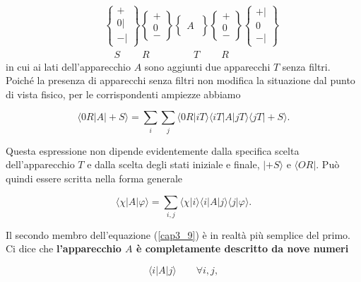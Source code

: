 \documentclass[a4paper,12pt,oneside]{book}
\begin{document}
\begin{eqnarray}
& &\begin{Bmatrix}
 + \\ 0 | \\ - |  
\end{Bmatrix}
\begin{Bmatrix}
  + \\ 0  \\ -   
\end{Bmatrix}
\begin{Bmatrix}
\quad \\  A  \\ \quad 
\end{Bmatrix}
\begin{Bmatrix}
  + \\ 0  \\ -   
\end{Bmatrix}
\begin{Bmatrix}
  +| \\ 0  \\ -|   
\end{Bmatrix} \\
& & \quad S  \ \qquad R\ \qquad  \ \qquad T\ \qquad R \nonumber
\end{eqnarray}
in cui ai lati dell'apparecchio $A$ sono aggiunti due apparecchi $T$ senza filtri. Poiché la presenza di apparecchi senza filtri non modifica la situazione dal punto di vista fisico, per le corrispondenti ampiezze abbiamo

\begin{equation}
\langle 0R|A| +S \rangle = \sum \limits_{i} \sum \limits_{j} \langle 0R | iT \rangle \langle iT | A | jT \rangle \langle jT | +S \rangle .
\end{equation}

Questa espressione non dipende evidentemente dalla specifica scelta dell'apparecchio $T$ e dalla scelta degli stati iniziale e finale, $| +S \rangle $ e $\langle OR |$. Può quindi essere scritta nella forma generale

\begin{equation}
\langle \chi | A | \varphi \rangle = \sum \limits_{i,j} \langle \chi | i \rangle \langle i | A | j \rangle \langle j | \varphi \rangle .
\label{cap3_9}
\end{equation}

Il secondo membro dell'equazione (\ref{cap3_9}) è in realtà più semplice del primo. Ci dice che \textbf{l'apparecchio $A$ è completamente descritto da nove numeri}

\begin{equation}
\langle i | A | j \rangle  \qquad \forall i,j ,
\end{equation}
\end{document}
